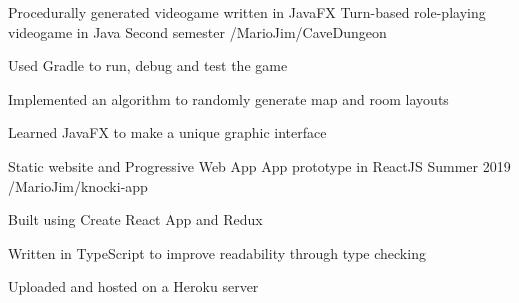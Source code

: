 

\begin{cventries}

\cventry
    {Procedurally generated videogame written in JavaFX} %
    {Turn-based role-playing videogame in Java} %
    {Second semester} %
    {\faGithub/MarioJim/CaveDungeon}
    {
      \begin{cvitems} %
        \item {Used Gradle to run, debug and test the game}
        \item {Implemented an algorithm to randomly generate map and room layouts}
        \item {Learned JavaFX to make a unique graphic interface}
      \end{cvitems}
    }
\cventry
    {Static website and Progressive Web App} %
    {App prototype in ReactJS} %
    {Summer 2019} %
    {\faGithub/MarioJim/knocki-app}
    {
      \begin{cvitems} %
        \item {Built using Create React App and Redux}
        \item {Written in TypeScript to improve readability through type checking}
        \item {Uploaded and hosted on a Heroku server}
      \end{cvitems}
    }

\end{cventries}
